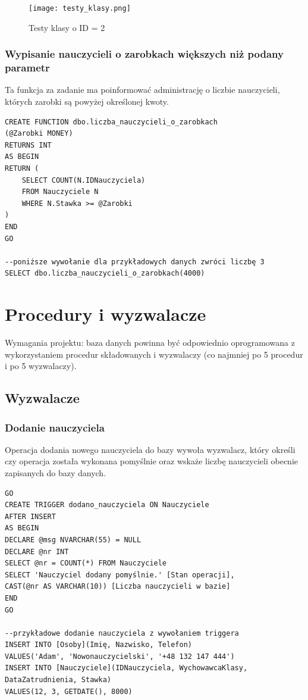 \documentclass[60pt]{article}
\begin{document}
\begin{figure}[h]
  \texttt{[image: testy\_klasy.png]}
  \caption{Testy klasy o ID = 2}
  \label{Testy klasy o ID = 2}
\end{figure}

\subsubsection{Wypisanie nauczycieli o zarobkach większych niż podany parametr}

Ta funkcja za zadanie ma poinformować administrację o liczbie nauczycieli, których zarobki są powyżej określonej kwoty. 

\begin{verbatim}
CREATE FUNCTION dbo.liczba_nauczycieli_o_zarobkach
(@Zarobki MONEY)
RETURNS INT
AS BEGIN
RETURN (
    SELECT COUNT(N.IDNauczyciela)
    FROM Nauczyciele N
    WHERE N.Stawka >= @Zarobki
)
END
GO

--poniższe wywołanie dla przykładowych danych zwróci liczbę 3
SELECT dbo.liczba_nauczycieli_o_zarobkach(4000)
\end{verbatim}

\newpage

\section{Procedury i wyzwalacze}

Wymagania projektu: baza danych powinna być odpowiednio oprogramowana z wykorzystaniem procedur składowanych i wyzwalaczy (co najmniej po 5 procedur i po 5 wyzwalaczy).

\subsection{Wyzwalacze}

\subsubsection{Dodanie nauczyciela}

Operacja dodania nowego nauczyciela do bazy wywoła wyzwalacz, który określi czy operacja została wykonana pomyślnie oraz wskaże liczbę nauczycieli obecnie zapisanych do bazy danych.

\begin{verbatim}
GO
CREATE TRIGGER dodano_nauczyciela ON Nauczyciele
AFTER INSERT
AS BEGIN
DECLARE @msg NVARCHAR(55) = NULL
DECLARE @nr INT
SELECT @nr = COUNT(*) FROM Nauczyciele
SELECT 'Nauczyciel dodany pomyślnie.' [Stan operacji], 
CAST(@nr AS VARCHAR(10)) [Liczba nauczycieli w bazie]
END
GO

--przykładowe dodanie nauczyciela z wywołaniem triggera
INSERT INTO [Osoby](Imię, Nazwisko, Telefon) 
VALUES('Adam', 'Nowonauczycielski', '+48 132 147 444')
INSERT INTO [Nauczyciele](IDNauczyciela, WychowawcaKlasy, DataZatrudnienia, Stawka)
VALUES(12, 3, GETDATE(), 8000)
\end{verbatim}
\end{document}
